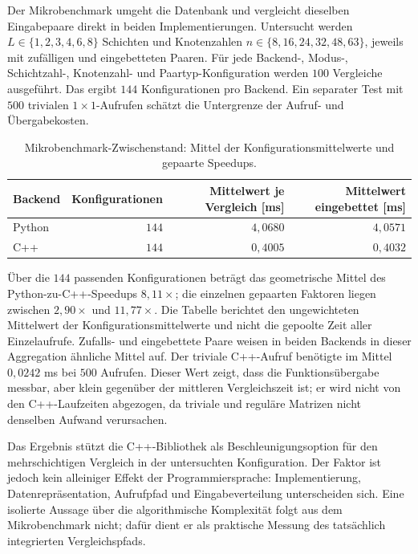 \documentclass[a4paper,12pt, twoside]{report}
\theoremstyle{definition}
\begin{document}
Der Mikrobenchmark umgeht die Datenbank und vergleicht dieselben Eingabepaare direkt in beiden Implementierungen. Untersucht werden $L\in\{1,2,3,4,6,8\}$ Schichten und Knotenzahlen $n\in\{8,16,24,32,48,63\}$, jeweils mit zufälligen und eingebetteten Paaren. Für jede Backend-, Modus-, Schichtzahl-, Knotenzahl- und Paartyp-Konfiguration werden $100$ Vergleiche ausgeführt. Das ergibt $144$ Konfigurationen pro Backend. Ein separater Test mit $500$ trivialen $1\times1$-Aufrufen schätzt die Untergrenze der Aufruf- und Übergabekosten.

\begin{table}[!htbp]
\centering
\small
\caption{Mikrobenchmark-Zwischenstand: Mittel der Konfigurationsmittelwerte und gepaarte Speedups.}
\label{tab:multiomics_micro}
\begin{tabular}{@{}lrrr@{}}
\toprule
Backend & Konfigurationen & Mittelwert je Vergleich [ms] & Mittelwert eingebettet [ms] \\
\midrule
Python & $144$ & $4{,}0680$ & $4{,}0571$ \\
C++ & $144$ & $0{,}4005$ & $0{,}4032$ \\
\bottomrule
\end{tabular}
\end{table}

Über die $144$ passenden Konfigurationen beträgt das geometrische Mittel des Python-zu-C++-Speedups $8{,}11\times$; die einzelnen gepaarten Faktoren liegen zwischen $2{,}90\times$ und $11{,}77\times$. Die Tabelle berichtet den ungewichteten Mittelwert der Konfigurationsmittelwerte und nicht die gepoolte Zeit aller Einzelaufrufe. Zufalls- und eingebettete Paare weisen in beiden Backends in dieser Aggregation ähnliche Mittel auf. Der triviale C++-Aufruf benötigte im Mittel $0{,}0242$ ms bei $500$ Aufrufen. Dieser Wert zeigt, dass die Funktionsübergabe messbar, aber klein gegenüber der mittleren Vergleichszeit ist; er wird nicht von den C++-Laufzeiten abgezogen, da triviale und reguläre Matrizen nicht denselben Aufwand verursachen.

Das Ergebnis stützt die C++-Bibliothek als Beschleunigungsoption für den mehrschichtigen Vergleich in der untersuchten Konfiguration. Der Faktor ist jedoch kein alleiniger Effekt der Programmiersprache: Implementierung, Datenrepräsentation, Aufrufpfad und Eingabeverteilung unterscheiden sich. Eine isolierte Aussage über die algorithmische Komplexität folgt aus dem Mikrobenchmark nicht; dafür dient er als praktische Messung des tatsächlich integrierten Vergleichspfads.
\end{document}
